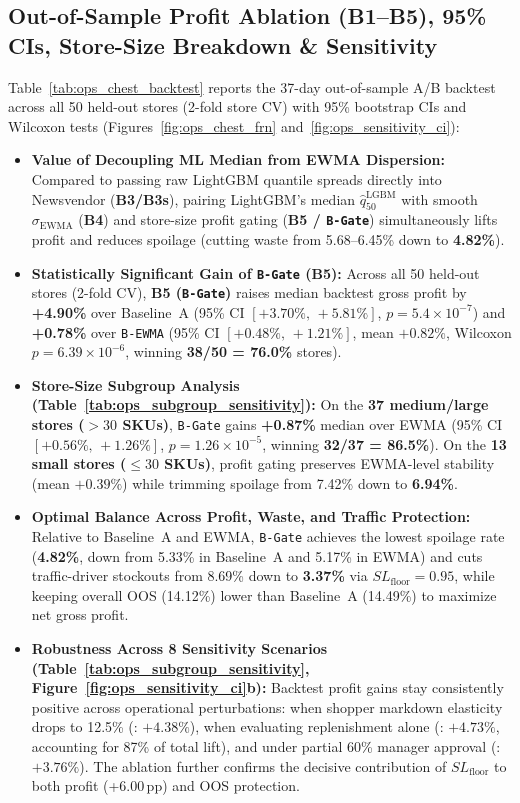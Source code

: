 \subsection*{Out-of-Sample Profit Ablation (B1--B5), 95\% CIs, Store-Size Breakdown \& Sensitivity}
Table~\ref{tab:ops_chest_backtest} reports the 37-day out-of-sample A/B backtest across all 50 held-out stores (2-fold store CV) with 95\% bootstrap CIs and Wilcoxon tests (Figures~\ref{fig:ops_chest_frn} and~\ref{fig:ops_sensitivity_ci}):
\begin{itemize}
    \item \textbf{Value of Decoupling ML Median from EWMA Dispersion:} Compared to passing raw LightGBM quantile spreads directly into Newsvendor (\textbf{B3/B3s}), pairing LightGBM's median $\hat{q}_{50}^{\text{LGBM}}$ with smooth $\sigma_{\text{EWMA}}$ (\textbf{B4}) and store-size profit gating (\textbf{B5 / \texttt{B-Gate}}) simultaneously lifts profit and reduces spoilage (cutting waste from 5.68--6.45\% down to \textbf{4.82\%}).
    \item \textbf{Statistically Significant Gain of \texttt{B-Gate} (B5):} Across all 50 held-out stores (2-fold CV), \textbf{B5 (\texttt{B-Gate})} raises median backtest gross profit by \textbf{+4.90\%} over Baseline~A (95\% CI $[+3.70\%,\,+5.81\%]$, $p=5.4\times 10^{-7}$) and \textbf{+0.78\%} over \texttt{B-EWMA} (95\% CI \textbf{$[+0.48\%,\,+1.21\%]$}, mean $+0.82\%$, Wilcoxon \textbf{$p = 6.39\times 10^{-6}$}, winning \textbf{38/50 = 76.0\%} stores).
    \item \textbf{Store-Size Subgroup Analysis (Table~\ref{tab:ops_subgroup_sensitivity}):} On the \textbf{37 medium/large stores ($>30$ SKUs)}, \texttt{B-Gate} gains \textbf{+0.87\%} median over EWMA (95\% CI $[+0.56\%,\,+1.26\%]$, $p = 1.26\times 10^{-5}$, winning \textbf{32/37 = 86.5\%}). On the \textbf{13 small stores ($\le 30$ SKUs)}, profit gating preserves EWMA-level stability (mean $+0.39\%$) while trimming spoilage from 7.42\% down to \textbf{6.94\%}.
    \item \textbf{Optimal Balance Across Profit, Waste, and Traffic Protection:} Relative to Baseline~A and EWMA, \texttt{B-Gate} achieves the lowest spoilage rate (\textbf{4.82\%}, down from 5.33\% in Baseline~A and 5.17\% in EWMA) and cuts traffic-driver stockouts from 8.69\% down to \textbf{3.37\%} via $SL_{\text{floor}} = 0.95$, while keeping overall OOS (14.12\%) lower than Baseline~A (14.49\%) to maximize net gross profit.
    \item \textbf{Robustness Across 8 Sensitivity Scenarios (Table~\ref{tab:ops_subgroup_sensitivity}, Figure~\ref{fig:ops_sensitivity_ci}b):} Backtest profit gains stay consistently positive across operational perturbations: when shopper markdown elasticity drops to 12.5\% (: $+4.38\%$), when evaluating replenishment alone (: $+4.73\%$, accounting for 87\% of total lift), and under partial 60\% manager approval (: $+3.76\%$). The  ablation further confirms the decisive contribution of $SL_{\text{floor}}$ to both profit (+6.00\,pp) and OOS protection.
\end{itemize}

